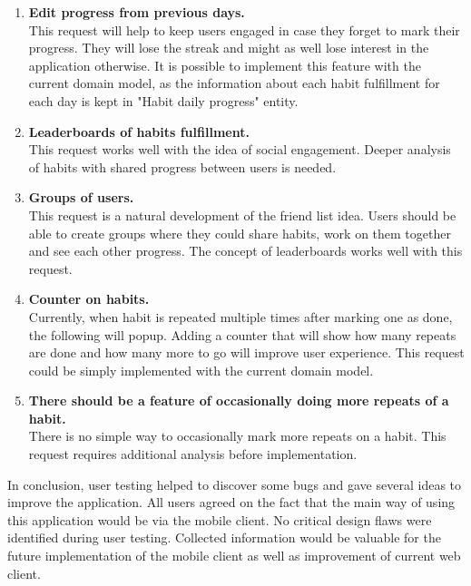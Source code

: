 \begin{enumerate}
    \item \textbf{Edit progress from previous days.}\\
        This request will help to keep users engaged in case they forget to mark their progress.
        They will lose the streak and might as well lose interest in the application otherwise.
        It is possible to implement this feature with the current domain model, as the information about each habit fulfillment for each day is kept in "Habit daily progress" entity.
    \item \textbf{Leaderboards of habits fulfillment.}\\
        This request works well with the idea of social engagement.
        Deeper analysis of habits with shared progress between users is needed.
    \item \textbf{Groups of users.}\\
        This request is a natural development of the friend list idea.
        Users should be able to create groups where they could share habits, work on them together and see each other progress.
        The concept of leaderboards works well with this request.
    \item \textbf{Counter on habits.}\\
        Currently, when habit is repeated multiple times after marking one as done, the following will popup.
        Adding a counter that will show how many repeats are done and how many more to go will improve user experience.
        This request could be simply implemented with the current domain model.
    \item \textbf{There should be a feature of occasionally doing more repeats of a habit.}\\
        There is no simple way to occasionally mark more repeats on a habit.
        This request requires additional analysis before implementation.
\end{enumerate}

In conclusion, user testing helped to discover some bugs and gave several ideas to improve the application.
All users agreed on the fact that the main way of using this application would be via the mobile client.
No critical design flaws were identified during user testing.
Collected information would be valuable for the future implementation of the mobile client as well as improvement of current web client.